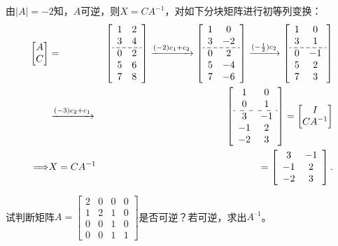 \begin{solution}
由$|A|=-2$知，$A$可逆，则$X=CA^{-1}$，对如下分块矩阵进行初等列变换：
\begin{eqnarray*}
\begin{bmatrix} A \\ C \end{bmatrix} & = &
  \setlength{\dashlinegap}{2pt}
  \left[ \begin{array}{cc}
    1 & 2 \\ 3 & 4 \\ \hdashline  0 & 2 \\ 5 & 6 \\ 7 & 8 \end{array} \right]
  \xrightarrow{(-2)c_1+c_2}
  \left[ \begin{array}{cc}
    1 & 0 \\ 3 & -2 \\ \hdashline  0 & 2 \\ 5 & -4 \\ 7 & -6 \end{array} \right]
  \xrightarrow{(-\frac12)c_2}
  \left[ \begin{array}{cc}
    1 & 0 \\ 3 & 1 \\ \hdashline  0 & -1 \\ 5 & 2 \\ 7 & 3 \end{array} \right] \\
  & \xrightarrow{(-3)c_2 + c_1} &
  \left[ \begin{array}{cc}
    1 & 0 \\ 0 & 1 \\ \hdashline  3 & -1 \\ -1 & 2 \\ -2 & 3 \end{array} \right]
  = \begin{bmatrix} I \\ CA^{-1} \end{bmatrix} \\
\Longrightarrow & X=CA^{-1} & = \left[ \begin{array}{cc}
    3 & -1 \\ -1 & 2 \\ -2 & 3 \end{array} \right].
\end{eqnarray*}
\end{solution}

\begin{eg}
试判断矩阵$A = \begin{bmatrix} 2 & 0 & 0 & 0 \\ 1 & 2 & 1 & 0 \\ 0 & 0 & 1 & 0 \\ 0 & 0 & 1 & 1 \end{bmatrix}$是否可逆？若可逆，求出$A^{–1}$。
\end{eg}

